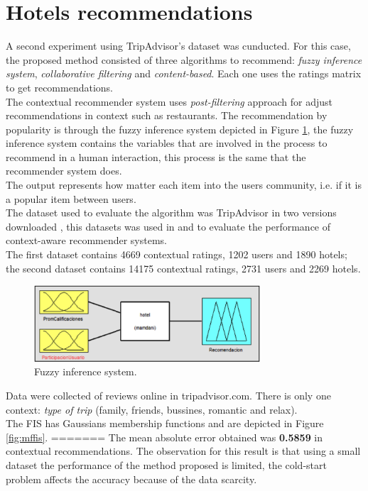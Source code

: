 \section{Hotels recommendations} \label{hotels}

A second experiment using TripAdvisor's dataset was cunducted.  For
this case, the proposed method consisted of three algorithms  to
recommend:  \textit{fuzzy inference system}, \textit{collaborative
filtering} and \textit{content-based}. Each one uses the ratings
matrix to get recommendations.\\     The contextual recommender system
uses  \textit{post-filtering} approach  \cite{adomavicius2011context}
for adjust recommendations in context such as restaurants. 
The recommendation by popularity is  through the fuzzy inference system
depicted in Figure  \ref{fig:fis},  the fuzzy inference system
contains the variables that are involved in the process to recommend
in a human interaction, this process is the same that the recommender
system does. \\The output represents how matter each item into the
users community, i.e. if it is a popular item between users. \\ The
dataset used to evaluate the algorithm was TripAdvisor in two versions
downloaded  \cite{linkzeng}, this datasets was used in
\cite{zheng2014context} and  \cite{zheng2012differential} to  evaluate
the performance of context-aware recommender systems. \\The first
dataset contains 4669 contextual ratings, 1202 users and 1890 hotels;
the second dataset contains 14175 contextual ratings, 2731 users and
2269 hotels. 
\begin{figure}
\captionsetup{justification=centering,margin=2cm,font=footnotesize}
\centering
\setlength\fboxsep{0pt}
\setlength\fboxrule{0.7pt}
\includegraphics[width=0.75\textwidth]{img/fis.png}
\caption{Fuzzy inference system.}
\label{fig:fis}   
\end{figure}
Data were collected of reviews online in tripadvisor.com.
There is only one context: \textit{type of trip} (family, friends,
bussines, romantic and relax).\\  The FIS has Gaussians membership
functions and are depicted in  Figure  \ref{fig:mffis}.
=======
The  mean absolute error obtained was \textbf{0.5859} 
in contextual recommendations. 
The observation for this result is that using a small
dataset the performance of the method proposed is limited, the cold-start 
problem affects the accuracy because of the data scarcity.

